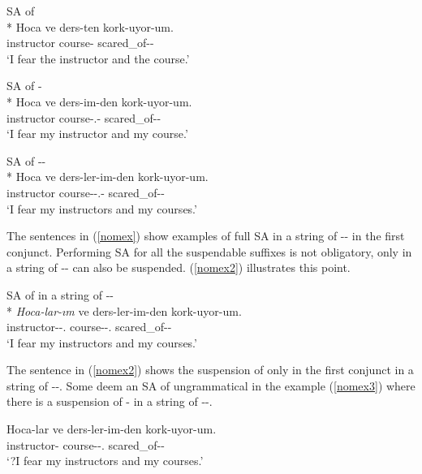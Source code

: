 \begin{exe}
    \ex \label{nomex} 
    \begin{xlist}
        \ex SA of {\Abl}\\*
        \gll Hoca ve ders-ten kork-uyor-um. \\
        instructor {\And} course-{\Abl} scared\_of-{\Prog}-{\Fsg} \\
        \glt `I fear the instructor and the course.'
        
        \ex SA of {\Poss-\Abl}\\*
        \gll Hoca ve ders-im-den kork-uyor-um. \\
        instructor {\And} course-{\Poss}.{\Fsg}-{\Abl} scared\_of-{\Prog}-{\Fsg} \\
        \glt `I fear my instructor and my course.' 
        
        \ex SA of {\Pl-\Poss-\Abl}\\*
        \gll Hoca ve ders-ler-im-den kork-uyor-um. \\ 
        instructor {\And} course-{\Pl}-{\Poss}.{\Fsg}-{\Abl} scared\_of-{\Prog}-{\Fsg} \\
        \glt `I fear my instructors and my courses.'
    \end{xlist}
\end{exe}
The sentences in (\ref{nomex}) show examples of full SA in a string of {\Pl}-{\Poss}-{\Case} in the first conjunct. Performing SA for all the suspendable suffixes is not obligatory, only {\Case} in a string of {\Pl}-{\Poss}-{\Case} can also be suspended. (\ref{nomex2}) illustrates this point.

\begin{exe}
    \ex \label{nomex2} SA of {\Abl} in a string of {\Pl-\Poss-\Abl}\\*
    \gll
    \textit{Hoca-lar-ım} ve ders-ler-im-den kork-uyor-um. \\ instructor-{\Pl}-{\Poss}.{\Fsg} {\And} course-{\Pl}-{\Poss}.{\Fsg} scared\_of-{\Prog}-{\Fsg} \\
    \glt `I fear my instructors and my courses.'
\end{exe}
The sentence in (\ref{nomex2}) shows the suspension of only {\Case} in the first conjunct in a string of {\Pl}-{\Poss}-{\Case}. Some deem an SA of {\Poss} ungrammatical in the example (\ref{nomex3}) where there is a suspension of {\Poss}-{\Case} in a string of {\Pl}-{\Poss}-{\Case}.

\begin{exe}
    \ex \label{nomex3}
    \gll 
    Hoca-lar ve ders-ler-im-den kork-uyor-um. \\ instructor-{\Pl} {\And} course-{\Pl}-{\Poss}.{\Fsg} scared\_of-{\Prog}-{\Fsg} \\
    \glt `?I fear my instructors and my courses.'
\end{exe}

